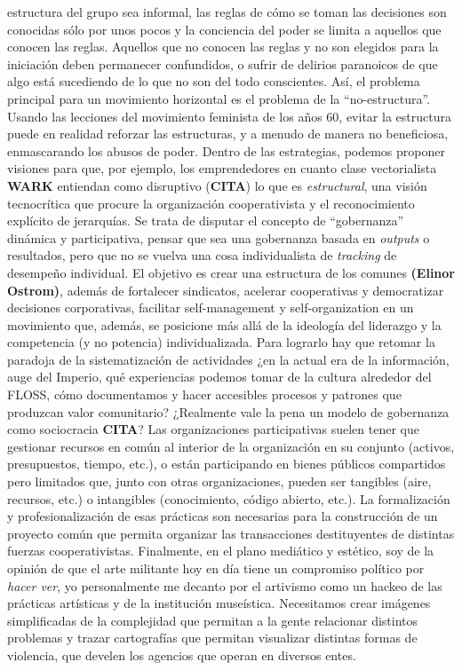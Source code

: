 \documentclass[
]{article}
\begin{document}
\begin{itemize}
  estructura del grupo sea informal, las reglas de cómo se toman las
  decisiones son conocidas sólo por unos pocos y la conciencia del poder
  se limita a aquellos que conocen las reglas. Aquellos que no conocen
  las reglas y no son elegidos para la iniciación deben permanecer
  confundidos, o sufrir de delirios paranoicos de que algo está
  sucediendo de lo que no son del todo conscientes. Así, el problema
  principal para un movimiento horizontal es el problema de la
  ``no-estructura''. Usando las lecciones del movimiento feminista de
  los años 60, evitar la estructura puede en realidad reforzar las
  estructuras, y a menudo de manera no beneficiosa, enmascarando los
  abusos de poder. Dentro de las estrategias, podemos proponer visiones
  para que, por ejemplo, los emprendedores en cuanto clase vectorialista
  \textbf{WARK} entiendan como disruptivo (\textbf{CITA}) lo que es
  \emph{estructural}, una visión tecnocrítica que procure la
  organización cooperativista y el reconocimiento explícito de
  jerarquías. Se trata de disputar el concepto de ``gobernanza''
  dinámica y participativa, pensar que sea una gobernanza basada en
  \emph{outputs} o resultados, pero que no se vuelva una cosa
  individualista de \emph{tracking} de desempeño individual. El objetivo
  es crear una estructura de los comunes \textbf{(Elinor Ostrom)},
  además de fortalecer sindicatos, acelerar cooperativas y democratizar
  decisiones corporativas, facilitar self-management y self-organization
  en un movimiento que, además, se posicione más allá de la ideología
  del liderazgo y la competencia (y no potencia) individualizada. Para
  lograrlo hay que retomar la paradoja de la sistematización de
  actividades ¿en la actual era de la información, auge del Imperio, qué
  experiencias podemos tomar de la cultura alrededor del FLOSS, cómo
  documentamos y hacer accesibles procesos y patrones que produzcan
  valor comunitario? ¿Realmente vale la pena un modelo de gobernanza
  como sociocracia \textbf{CITA}? Las organizaciones participativas
  suelen tener que gestionar recursos en común al interior de la
  organización en su conjunto (activos, presupuestos, tiempo, etc.), o
  están participando en bienes públicos compartidos pero limitados que,
  junto con otras organizaciones, pueden ser tangibles (aire, recursos,
  etc.) o intangibles (conocimiento, código abierto, etc.). La
  formalización y profesionalización de esas prácticas son necesarias
  para la construcción de un proyecto común que permita organizar las
  transacciones destituyentes de distintas fuerzas cooperativistas.
  Finalmente, en el plano mediático y estético, soy de la opinión de que
  el arte militante hoy en día tiene un compromiso político por
  \emph{hacer ver}, yo personalmente me decanto por el artivismo como un
  hackeo de las prácticas artísticas y de la institución museística.
  Necesitamos crear imágenes simplificadas de la complejidad que
  permitan a la gente relacionar distintos problemas y trazar
  cartografías que permitan visualizar distintas formas de violencia,
  que develen los agencios que operan en diversos entes.
\end{itemize}
\end{document}
